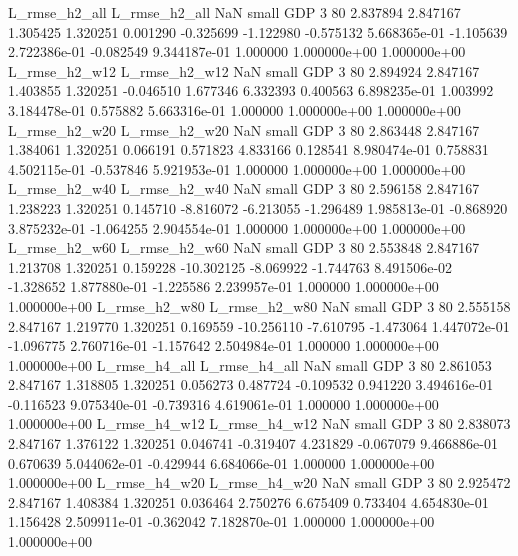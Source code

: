  L_rmse_h2_all  L_rmse_h2_all                   NaN      small      GDP                 3 80 2.837894       2.847167 1.305425       1.320251    0.001290     -0.325699     -1.122980    -0.575132   5.668365e-01 -1.105639 2.722386e-01    -0.082549   9.344187e-01            1.000000    1.000000e+00        1.000000e+00
 L_rmse_h2_w12  L_rmse_h2_w12                   NaN      small      GDP                 3 80 2.894924       2.847167 1.403855       1.320251   -0.046510      1.677346      6.332393     0.400563   6.898235e-01  1.003992 3.184478e-01     0.575882   5.663316e-01            1.000000    1.000000e+00        1.000000e+00
 L_rmse_h2_w20  L_rmse_h2_w20                   NaN      small      GDP                 3 80 2.863448       2.847167 1.384061       1.320251    0.066191      0.571823      4.833166     0.128541   8.980474e-01  0.758831 4.502115e-01    -0.537846   5.921953e-01            1.000000    1.000000e+00        1.000000e+00
 L_rmse_h2_w40  L_rmse_h2_w40                   NaN      small      GDP                 3 80 2.596158       2.847167 1.238223       1.320251    0.145710     -8.816072     -6.213055    -1.296489   1.985813e-01 -0.868920 3.875232e-01    -1.064255   2.904554e-01            1.000000    1.000000e+00        1.000000e+00
 L_rmse_h2_w60  L_rmse_h2_w60                   NaN      small      GDP                 3 80 2.553848       2.847167 1.213708       1.320251    0.159228    -10.302125     -8.069922    -1.744763   8.491506e-02 -1.328652 1.877880e-01    -1.225586   2.239957e-01            1.000000    1.000000e+00        1.000000e+00
 L_rmse_h2_w80  L_rmse_h2_w80                   NaN      small      GDP                 3 80 2.555158       2.847167 1.219770       1.320251    0.169559    -10.256110     -7.610795    -1.473064   1.447072e-01 -1.096775 2.760716e-01    -1.157642   2.504984e-01            1.000000    1.000000e+00        1.000000e+00
 L_rmse_h4_all  L_rmse_h4_all                   NaN      small      GDP                 3 80 2.861053       2.847167 1.318805       1.320251    0.056273      0.487724     -0.109532     0.941220   3.494616e-01 -0.116523 9.075340e-01    -0.739316   4.619061e-01            1.000000    1.000000e+00        1.000000e+00
 L_rmse_h4_w12  L_rmse_h4_w12                   NaN      small      GDP                 3 80 2.838073       2.847167 1.376122       1.320251    0.046741     -0.319407      4.231829    -0.067079   9.466886e-01  0.670639 5.044062e-01    -0.429944   6.684066e-01            1.000000    1.000000e+00        1.000000e+00
 L_rmse_h4_w20  L_rmse_h4_w20                   NaN      small      GDP                 3 80 2.925472       2.847167 1.408384       1.320251    0.036464      2.750276      6.675409     0.733404   4.654830e-01  1.156428 2.509911e-01    -0.362042   7.182870e-01            1.000000    1.000000e+00        1.000000e+00

